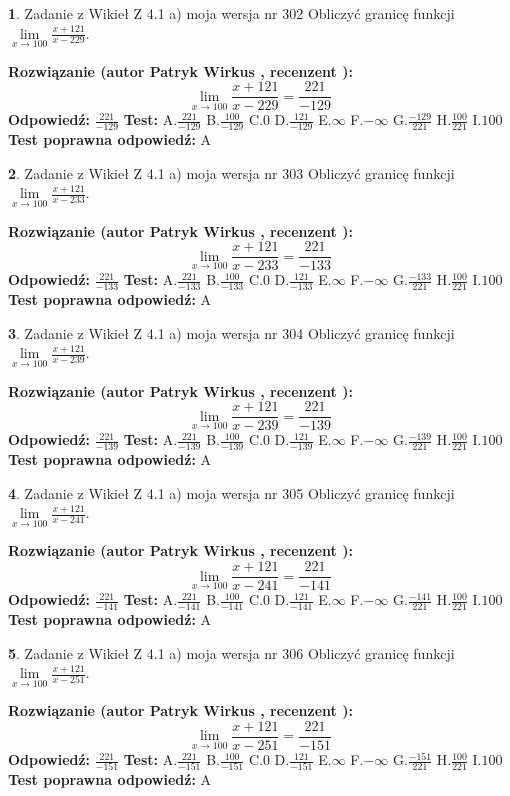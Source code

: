 \documentclass[12pt, a4paper]{article}
\theoremstyle{definition} %
\newtheorem{zad}{}
\newcommand{\zadStart}[1]{\begin{zad}#1\newline}
\newcommand{\zadStop}{\end{zad}}
\newcommand{\rozwStart}[2]{\noindent \textbf{Rozwiązanie (autor #1 , recenzent #2): }\newline}
\newcommand{\rozwStop}{\newline}
\newcommand{\odpStart}{\noindent \textbf{Odpowiedź:}\newline}
\newcommand{\odpStop}{\newline}
\newcommand{\testStart}{\noindent \textbf{Test:}\newline}
\newcommand{\testStop}{\newline}
\newcommand{\kluczStart}{\noindent \textbf{Test poprawna odpowiedź:}\newline}
\newcommand{\kluczStop}{\newline}
\begin{document}
\zadStart{Zadanie z Wikieł Z 4.1 a) moja wersja nr 302}
Obliczyć granicę funkcji $\lim\limits_{x\to100}\frac{x+121}{x-229}$.
\zadStop
\rozwStart{Patryk Wirkus}{}
$$\lim\limits_{x\to100}\frac{x+121}{x-229} = \frac{221}{-129}$$
\rozwStop
\odpStart
$\frac{221}{-129}$
\odpStop
\testStart
A.$\frac{221}{-129}$
B.$\frac{100}{-129}$
C.$0$
D.$\frac{121}{-129}$
E.$\infty$
F.$-\infty$
G.$\frac{-129}{221}$
H.$\frac{100}{221}$
I.$100$
\testStop
\kluczStart
A
\kluczStop



\zadStart{Zadanie z Wikieł Z 4.1 a) moja wersja nr 303}
Obliczyć granicę funkcji $\lim\limits_{x\to100}\frac{x+121}{x-233}$.
\zadStop
\rozwStart{Patryk Wirkus}{}
$$\lim\limits_{x\to100}\frac{x+121}{x-233} = \frac{221}{-133}$$
\rozwStop
\odpStart
$\frac{221}{-133}$
\odpStop
\testStart
A.$\frac{221}{-133}$
B.$\frac{100}{-133}$
C.$0$
D.$\frac{121}{-133}$
E.$\infty$
F.$-\infty$
G.$\frac{-133}{221}$
H.$\frac{100}{221}$
I.$100$
\testStop
\kluczStart
A
\kluczStop



\zadStart{Zadanie z Wikieł Z 4.1 a) moja wersja nr 304}
Obliczyć granicę funkcji $\lim\limits_{x\to100}\frac{x+121}{x-239}$.
\zadStop
\rozwStart{Patryk Wirkus}{}
$$\lim\limits_{x\to100}\frac{x+121}{x-239} = \frac{221}{-139}$$
\rozwStop
\odpStart
$\frac{221}{-139}$
\odpStop
\testStart
A.$\frac{221}{-139}$
B.$\frac{100}{-139}$
C.$0$
D.$\frac{121}{-139}$
E.$\infty$
F.$-\infty$
G.$\frac{-139}{221}$
H.$\frac{100}{221}$
I.$100$
\testStop
\kluczStart
A
\kluczStop



\zadStart{Zadanie z Wikieł Z 4.1 a) moja wersja nr 305}
Obliczyć granicę funkcji $\lim\limits_{x\to100}\frac{x+121}{x-241}$.
\zadStop
\rozwStart{Patryk Wirkus}{}
$$\lim\limits_{x\to100}\frac{x+121}{x-241} = \frac{221}{-141}$$
\rozwStop
\odpStart
$\frac{221}{-141}$
\odpStop
\testStart
A.$\frac{221}{-141}$
B.$\frac{100}{-141}$
C.$0$
D.$\frac{121}{-141}$
E.$\infty$
F.$-\infty$
G.$\frac{-141}{221}$
H.$\frac{100}{221}$
I.$100$
\testStop
\kluczStart
A
\kluczStop



\zadStart{Zadanie z Wikieł Z 4.1 a) moja wersja nr 306}
Obliczyć granicę funkcji $\lim\limits_{x\to100}\frac{x+121}{x-251}$.
\zadStop
\rozwStart{Patryk Wirkus}{}
$$\lim\limits_{x\to100}\frac{x+121}{x-251} = \frac{221}{-151}$$
\rozwStop
\odpStart
$\frac{221}{-151}$
\odpStop
\testStart
A.$\frac{221}{-151}$
B.$\frac{100}{-151}$
C.$0$
D.$\frac{121}{-151}$
E.$\infty$
F.$-\infty$
G.$\frac{-151}{221}$
H.$\frac{100}{221}$
I.$100$
\testStop
\kluczStart
A
\kluczStop
\end{document}
